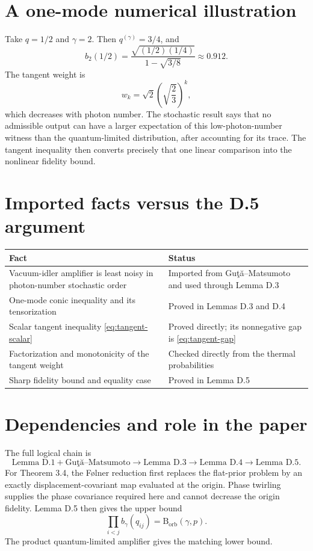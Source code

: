 \documentclass[11pt]{article}
\begin{document}
\section{A one-mode numerical illustration}

Take $q=1/2$ and $\gamma=2$.  Then $q^{(\gamma)}=3/4$, and
\[
  b_2(1/2)
  =\frac{\sqrt{(1/2)(1/4)}}{1-\sqrt{3/8}}
  \approx0.912.
\]
The tangent weight is
\[
  w_k=\sqrt2\left(\sqrt{\frac23}\right)^k,
\]
which decreases with photon number.  The stochastic result says that no
admissible output can have a larger expectation of this low-photon-number
witness than the quantum-limited distribution, after accounting for its
trace.  The tangent inequality then converts precisely that one linear
comparison into the nonlinear fidelity bound.

\section{Imported facts versus the D.5 argument}

\begin{center}
\begin{tabular}{p{}p{}}
\hline
Fact & Status\\
\hline
Vacuum-idler amplifier is least noisy in photon-number stochastic order &
Imported from Gu\c{t}\u{a}--Matsumoto and used through Lemma D.3\\
One-mode conic inequality and its tensorization & Proved in Lemmas D.3 and
D.4\\
Scalar tangent inequality \eqref{eq:tangent-scalar} & Proved directly; its
nonnegative gap is \eqref{eq:tangent-gap}\\
Factorization and monotonicity of the tangent weight & Checked directly from
the thermal probabilities\\
Sharp fidelity bound and equality case & Proved in Lemma D.5\\
\hline
\end{tabular}
\end{center}

\section{Dependencies and role in the paper}

The full logical chain is
\[
  \text{Lemma D.1}
  +\text{Gu\c{t}\u{a}--Matsumoto}
  \longrightarrow\text{Lemma D.3}
  \longrightarrow\text{Lemma D.4}
  \longrightarrow\text{Lemma D.5}.
\]
For Theorem 3.4, the F\o lner reduction first replaces the flat-prior problem
by an exactly displacement-covariant map evaluated at the origin.  Phase
twirling supplies the phase covariance required here and cannot decrease the
origin fidelity.  Lemma D.5 then gives the upper bound
\[
  \prod_{i<j}b_\gamma(q_{ij})=\mathrm B_{\mathrm{orb}}(\gamma,p).
\]
The product quantum-limited amplifier gives the matching lower bound.
\end{document}

